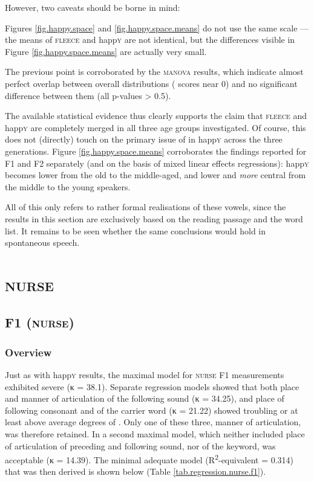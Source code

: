 However, two caveats should be borne in mind:
\begin{inparaenum}[(1)]
	\item Figures \ref{fig.happy.space} and \ref{fig.happy.space.means} do not use the same scale --- the means of \textsc{fleece} and happ\textsc{y} are not identical, but the differences visible in Figure \ref{fig.happy.space.means} are actually very small.
	\item The previous point is corroborated by the \textsc{manova} results, which indicate almost perfect overlap between overall distributions ( scores near 0) and no significant difference between them (all p-values > 0.5).
\end{inparaenum}
The available statistical evidence thus clearly supports the claim that \textsc{fleece} and happ\textsc{y} are completely merged in all three age groups investigated.
Of course, this does not (directly) touch on the primary issue of  in happ\textsc{y} across the three generations.
Figure \ref{fig.happy.space.means} corroborates the findings reported for F1 and F2 separately (and on the basis of mixed linear effects regressions): happ\textsc{y} becomes lower from the old to the middle-aged, and lower and \emph{more} central from the middle to the young speakers.

All of this only refers to rather formal realisations of these vowels, since the results in this section are exclusively based on the reading passage and the word list.
It remains to be seen whether the same conclusions would hold in spontaneous speech.

\section{\textrm{\textsc{nurse}}}
\label{sec.prod.res.vow.nurse}

\subsection{F1 (\textrm{\textsc{nurse}})}
\label{sec.prod.res.vow.nurse.f1}

\subsubsection{Overview}
\label{sec.prod.res.vow.nurse.f1.overview}

Just as with happ\textsc{y} results, the maximal model for \textsc{nurse} F1 measurements exhibited severe  (κ = 38.1).
Separate regression models showed that both place and manner of articulation of the following sound (κ = 34.25), and place of following consonant and  of the carrier word (κ = 21.22) showed troubling or at least above average degrees of .
Only one of these three, manner of articulation, was therefore retained.
In a second maximal model, which neither included place of articulation of preceding and following sound, nor  of the keyword,  was acceptable (κ = 14.39).
The minimal adequate model (R\textsuperscript{2}-equivalent = 0.314) that was then derived is shown below (Table \ref{tab.regression.nurse.f1}).

